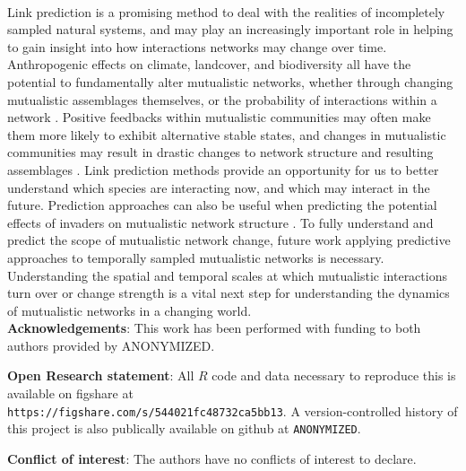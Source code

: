 \documentclass[num-refs]{wiley-article}%
\begin{document}
\paragraph*{}
Link prediction is a promising method to deal with the realities of incompletely sampled natural systems, and may play an increasingly important role in helping to gain insight into how interactions networks may change over time. Anthropogenic effects on climate, landcover, and biodiversity all have the potential to fundamentally alter mutualistic networks, whether through changing mutualistic assemblages themselves, or the probability of interactions within a network \cite{tylianakis2017ecological, memmott2007global, teixido2022anthropogenic}. Positive feedbacks within mutualistic communities may often make them more likely to exhibit alternative stable states, and changes in mutualistic communities may result in drastic changes to network structure and resulting assemblages \cite{lever2014sudden, bascompte2022resilience}. Link prediction methods provide an opportunity for us to better understand which species are interacting now, and which may interact in the future. Prediction approaches can also be useful when predicting the potential effects of invaders on mutualistic network structure \cite{fricke2020accelerating,traveset2014mutualistic}. To fully understand and predict the scope of mutualistic network change, future work applying predictive approaches to temporally sampled mutualistic networks is necessary. Understanding the spatial and temporal scales at which mutualistic interactions turn over or change strength is a vital next step for understanding the dynamics of mutualistic networks in a changing world.\\

\noindent \textbf{Acknowledgements}: This work has been performed with funding to both authors provided by ANONYMIZED. 

\noindent \textbf{Open Research statement}: All $R$ code and data necessary to reproduce this is available on figshare at \\ \texttt{https://figshare.com/s/544021fc48732ca5bb13}. A version-controlled history of this project is also publically available on github at \texttt{ANONYMIZED}.

\noindent \textbf{Conflict of interest}: The authors have no conflicts of interest to declare.



\clearpage
%

\end{document}
